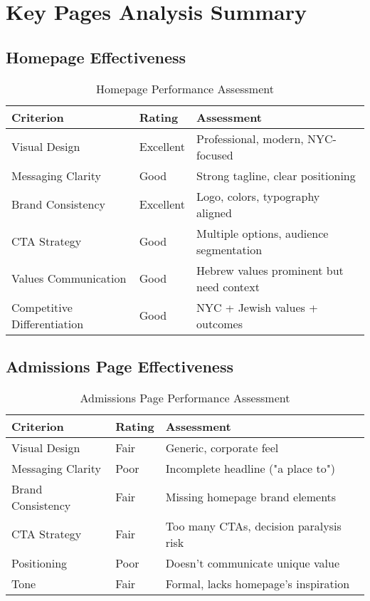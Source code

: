 \documentclass[12pt,letterpaper]{article}
\begin{document}
\section{Key Pages Analysis Summary}

\subsection{Homepage Effectiveness}

\begin{table}[h]
\centering
\begin{tabular}{@{}lll@{}}
\toprule
\textbf{Criterion} & \textbf{Rating} & \textbf{Assessment} \\
\midrule
Visual Design & Excellent & Professional, modern, NYC-focused \\
Messaging Clarity & Good & Strong tagline, clear positioning \\
Brand Consistency & Excellent & Logo, colors, typography aligned \\
CTA Strategy & Good & Multiple options, audience segmentation \\
Values Communication & Good & Hebrew values prominent but need context \\
Competitive Differentiation & Good & NYC + Jewish values + outcomes \\
\bottomrule
\end{tabular}
\caption{Homepage Performance Assessment}
\end{table}

\subsection{Admissions Page Effectiveness}

\begin{table}[h]
\centering
\begin{tabular}{@{}lll@{}}
\toprule
\textbf{Criterion} & \textbf{Rating} & \textbf{Assessment} \\
\midrule
Visual Design & Fair & Generic, corporate feel \\
Messaging Clarity & Poor & Incomplete headline ("a place to") \\
Brand Consistency & Fair & Missing homepage brand elements \\
CTA Strategy & Fair & Too many CTAs, decision paralysis risk \\
Positioning & Poor & Doesn't communicate unique value \\
Tone & Fair & Formal, lacks homepage's inspiration \\
\bottomrule
\end{tabular}
\caption{Admissions Page Performance Assessment}
\end{table}
\end{document}
